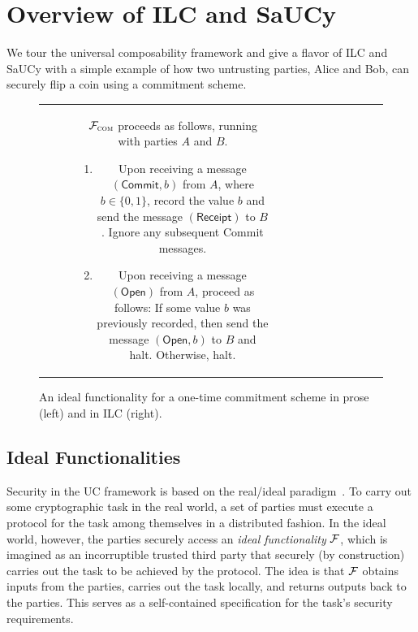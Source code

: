 \section{Overview of ILC and SaUCy}
\label{sec:background}

We tour the universal composability framework and give a flavor of ILC and SaUCy
with a simple example of how two untrusting parties, Alice and Bob, can securely
flip a coin using a commitment scheme.

\begin{figure}[t]
\centering
\begin{tabular}{c|c}
\begin{subfigure}{.575\textwidth}
    $\mathcal{{F}}_{\textsc{com}}$ proceeds as follows, running with parties $A$ and
  $B$.
    \begin{enumerate}
        \item Upon receiving a message $(\mathsf{Commit}, b)$ from $A$, where $b
          \in \{ 0, 1 \}$, record the value $b$ and send the message
          $(\mathsf{Receipt})$ to $B$. Ignore any subsequent \textsf{Commit}
          messages.
        \item Upon receiving a message $(\mathsf{Open})$ from $A$, proceed as
          follows: If some value $b$ was previously recorded, then send the
          message $(\mathsf{Open}, b)$ to $B$ and halt. Otherwise, halt.
    \end{enumerate}
\label{func:com}
\end{subfigure}\hspace{0.02\textwidth}
&\hspace{0.02\textwidth}
\begin{subfigure}{.35\textwidth}
  
\end{subfigure}
\end{tabular}
\caption{An ideal functionality for a one-time commitment scheme in prose (left)
  and in ILC (right).}
\label{func:com}
\end{figure}

\subsection{Ideal Functionalities}
\label{subsec:functionalities}

Security in the UC framework is based on the real/ideal
paradigm~\cite{goldreich1987play}. To carry out some cryptographic task in the
real world, a set of parties must execute a protocol for the task among
themselves in a distributed fashion. In the ideal world, however, the parties
securely access an \emph{ideal functionality} $\mathcal{{F}}$, which is imagined as an
incorruptible trusted third party that securely (by construction) carries out
the task to be achieved by the protocol. The idea is that $\mathcal{{F}}$ obtains
inputs from the parties, carries out the task locally, and returns outputs back
to the parties. This serves as a self-contained specification
for the task's security requirements.\smallskip

